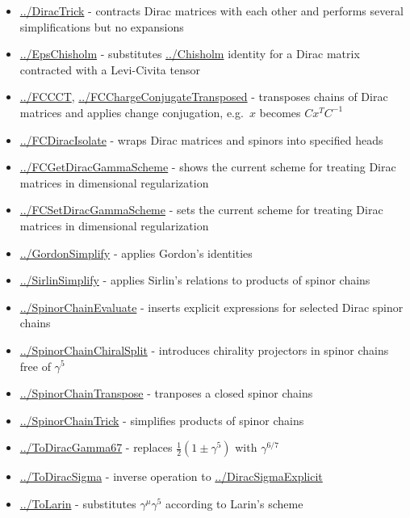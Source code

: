 \documentclass[../FeynCalcManual.tex]{subfiles}
\begin{document}
\begin{itemize}
\item
  \hyperlink{../diractrick}{../DiracTrick} - contracts Dirac matrices
  with each other and performs several simplifications but no expansions
\item
  \hyperlink{../epschisholm}{../EpsChisholm} - substitutes
  \hyperlink{../chisholm}{../Chisholm} identity for a Dirac matrix
  contracted with a Levi-Civita tensor
\item
  \hyperlink{../fccct}{../FCCCT},
  \hyperlink{../fcchargeconjugatetransposed}{../FCChargeConjugateTransposed}
  - transposes chains of Dirac matrices and applies change conjugation,
  e.g.~\(x\) becomes \(C x^T C^{-1}\)
\item
  \hyperlink{../fcdiracisolate}{../FCDiracIsolate} - wraps Dirac
  matrices and spinors into specified heads
\item
  \hyperlink{../fcgetdiracgammascheme}{../FCGetDiracGammaScheme} - shows
  the current scheme for treating Dirac matrices in dimensional
  regularization
\item
  \hyperlink{../fcsetdiracgammascheme}{../FCSetDiracGammaScheme} - sets
  the current scheme for treating Dirac matrices in dimensional
  regularization
\item
  \hyperlink{../gordonsimplify}{../GordonSimplify} - applies Gordon's
  identities
\item
  \hyperlink{../sirlinsimplify}{../SirlinSimplify} - applies Sirlin's
  relations to products of spinor chains
\item
  \hyperlink{../spinorchainevaluate}{../SpinorChainEvaluate} - inserts
  explicit expressions for selected Dirac spinor chains
\item
  \hyperlink{../spinorchainchiralsplit}{../SpinorChainChiralSplit} -
  introduces chirality projectors in spinor chains free of \(\gamma^5\)
\item
  \hyperlink{../spinorchaintranspose}{../SpinorChainTranspose} -
  tranposes a closed spinor chains
\item
  \hyperlink{../spinorchaintrick}{../SpinorChainTrick} - simplifies
  products of spinor chains
\item
  \hyperlink{../todiracgamma67}{../ToDiracGamma67} - replaces
  \(\frac{1}{2}(1 \pm \gamma^5)\) with \(\gamma^{6/7}\)
\item
  \hyperlink{../todiracsigma}{../ToDiracSigma} - inverse operation to
  \hyperlink{../diracsigmaexplicit}{../DiracSigmaExplicit}
\item
  \hyperlink{../tolarin}{../ToLarin} - substitutes
  \(\gamma^\mu \gamma^5\) according to Larin's scheme
\end{itemize}
\end{document}
